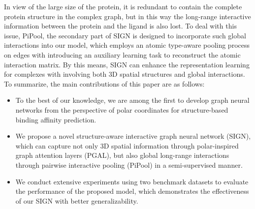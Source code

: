 \documentclass[sigconf]{acmart}
\newcommand{\model}{\textsf{SIGN}\xspace}
\newcommand{\gnn}{PGAL\xspace}
\newcommand{\pool}{PiPool\xspace}
\begin{document}
In view of the large size of the protein, it is redundant to contain the complete protein structure in the complex graph, but in this way the long-range interactive information between the protein and the ligand is also lost. To deal with this issue, \pool, the secondary part of \model is designed to incorporate such global interactions into our model, which employs an atomic type-aware pooling process on edges with introducing an auxiliary learning task to reconstruct the atomic interaction matrix. By this means, \model can enhance the representation learning for complexes with involving both 3D spatial structures and global interactions. To summarize, the main contributions of this paper are as follows:
\begin{itemize}[leftmargin=*,topsep=3pt]
    \item To the best of our knowledge, we are among the first to develop graph neural networks from the perspective of polar coordinates for structure-based binding affinity prediction. 
    \item We propose a novel structure-aware interactive graph neural network (\model), which can capture not only 3D spatial information through polar-inspired graph attention layers (\gnn), but also global long-range interactions through pairwise interactive pooling (\pool) in a semi-supervised manner.
     \item We conduct extensive experiments using two benchmark datasets to evaluate the performance of the proposed model, which demonstrates the effectiveness of our \model with better generalizability.
\end{itemize}

\vspace{-5mm}
\end{document}
